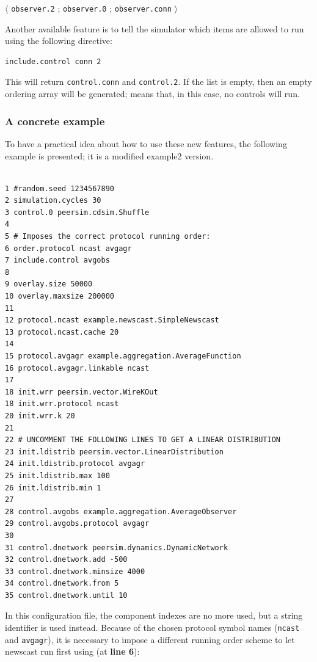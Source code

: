 \documentclass[a4paper,11pt]{article}
\begin{document}
\begin{center}
$\langle$ \texttt{observer.2} ; \texttt{observer.0} ;
\texttt{observer.conn} $\rangle$
 
\end{center}

Another available feature is to tell the simulator which items are
allowed to run using the  following directive:

\begin{verbatim}
include.control conn 2
\end{verbatim}

This will return \texttt{control.conn} and \texttt{control.2}.
If the list is empty, then an empty ordering array will be
generated; means that, in this case, no controls will run. 

\subsubsection{A concrete example}

To have a practical idea about how to use these new features, the following
example is presented; it is a modified example2 version.

\footnotesize
\begin{verbatim}

1 #random.seed 1234567890
2 simulation.cycles 30
3 control.0 peersim.cdsim.Shuffle
4
5 # Imposes the correct protocol running order:
6 order.protocol ncast avgagr
7 include.control avgobs
8 
9 overlay.size 50000
10 overlay.maxsize 200000
11 
12 protocol.ncast example.newscast.SimpleNewscast
13 protocol.ncast.cache 20
14
15 protocol.avgagr example.aggregation.AverageFunction
16 protocol.avgagr.linkable ncast
17
18 init.wrr peersim.vector.WireKOut
18 init.wrr.protocol ncast
20 init.wrr.k 20
21
22 # UNCOMMENT THE FOLLOWING LINES TO GET A LINEAR DISTRIBUTION
23 init.ldistrib peersim.vector.LinearDistribution
24 init.ldistrib.protocol avgagr
25 init.ldistrib.max 100
26 init.ldistrib.min 1
27
28 control.avgobs example.aggregation.AverageObserver
29 control.avgobs.protocol avgagr
30
31 control.dnetwork peersim.dynamics.DynamicNetwork
32 control.dnetwork.add -500
33 control.dnetwork.minsize 4000
34 control.dnetwork.from 5
35 control.dnetwork.until 10
\end{verbatim}
\normalsize

In this configuration file, the component indexes are no more used,
but a string identifier is used instead. 
Because of the chosen protocol symbol names (\texttt{ncast} and 
\texttt{avgagr}),
it is necessary to impose a different running order scheme to let
newscast run first using (at \textbf{line 6}):
\end{document}
